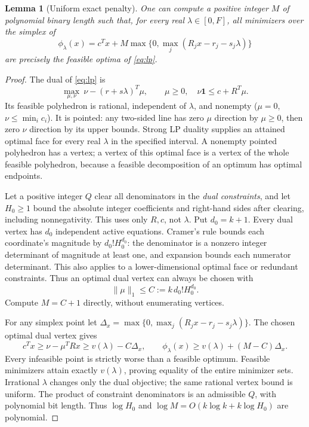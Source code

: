\documentclass[11pt]{article}
\newtheorem{lemma}[theorem]{Lemma}
\theoremstyle{remark}\newtheorem{remark}[theorem]{Remark}
\newcommand{\one}{\mathbf1}
\begin{document}
\begin{lemma}[Uniform exact penalty]\label{lem:penalty}
One can compute a positive integer $M$ of polynomial binary length such that, for every real $\lambda\in[0,F]$, all minimizers over the simplex of
\begin{equation}\label{eq:penalty}
 \phi_\lambda(x)=c^Tx+M\max\{0,\max_j(R_jx-r_j-s_j\lambda)\}
\end{equation}
are precisely the feasible optima of \eqref{eq:lp}.
\end{lemma}
\begin{proof}
The dual of \eqref{eq:lp} is
\[
 \max_{\mu,\nu}\ \nu-(r+s\lambda)^T\mu,
 \qquad \mu\ge0,\quad \nu\one\le c+R^T\mu.
\]
Its feasible polyhedron is rational, independent of $\lambda$, and nonempty ($\mu=0$, $\nu\le\min_i c_i$). It is pointed: any two-sided line has zero $\mu$ direction by $\mu\ge0$, then zero $\nu$ direction by its upper bounds. Strong LP duality supplies an attained optimal face for every real $\lambda$ in the specified interval. A nonempty pointed polyhedron has a vertex; a vertex of this optimal face is a vertex of the whole feasible polyhedron, because a feasible decomposition of an optimum has optimal endpoints.

Let a positive integer $Q$ clear all denominators in the \emph{dual constraints}, and let $H_0\ge1$ bound the absolute integer coefficients and right-hand sides after clearing, including nonnegativity. This uses only $R,c$, not $\lambda$. Put $d_0=k+1$. Every dual vertex has $d_0$ independent active equations. Cramer's rule bounds each coordinate's magnitude by $d_0!H_0^{d_0}$: the denominator is a nonzero integer determinant of magnitude at least one, and expansion bounds each numerator determinant. This also applies to a lower-dimensional optimal face or redundant constraints. Thus an optimal dual vertex can always be chosen with
\[
 \|\mu\|_1\le C:=k\,d_0!H_0^{d_0}.
\]
Compute $M=C+1$ directly, without enumerating vertices.

For any simplex point let $\Delta_x=\max\{0,\max_j(R_jx-r_j-s_j\lambda)\}$. The chosen optimal dual vertex gives
\[
 c^Tx\ge\nu-\mu^TRx\ge v(\lambda)-C\Delta_x,
 \qquad \phi_\lambda(x)\ge v(\lambda)+(M-C)\Delta_x.
\]
Every infeasible point is strictly worse than a feasible optimum. Feasible minimizers attain exactly $v(\lambda)$, proving equality of the entire minimizer sets. Irrational $\lambda$ changes only the dual objective; the same rational vertex bound is uniform. The product of constraint denominators is an admissible $Q$, with polynomial bit length. Thus $\log H_0$ and $\log M=O(k\log k+k\log H_0)$ are polynomial.
\end{proof}
\end{document}
